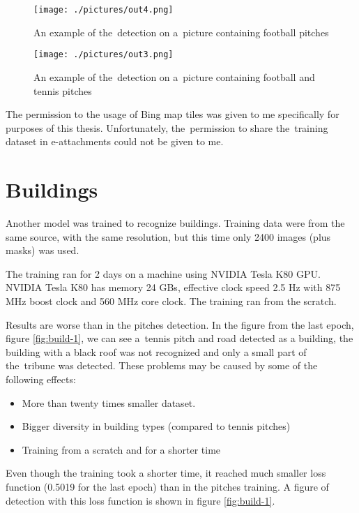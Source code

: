 \begin{figure}[H]
   \centering
	\texttt{[image: ./pictures/out4.png]}
	\caption[Detection of football pitches, another resolution]{An example of
	the~detection on a~picture containing football pitches}
      \label{fig:football2}
\end{figure}

\begin{figure}[H]
   \centering
	\texttt{[image: ./pictures/out3.png]}
	\caption[Detection of football and tennis pitches]{An example of the~detection
	on a~picture containing football and tennis pitches}
      \label{fig:football-tennis}
\end{figure}

The permission to the usage of Bing map tiles was given to me specifically for 
purposes of this thesis. Unfortunately, the~permission to share the~training 
dataset in e-attachments could not be given to me.

\section{Buildings}

Another model was trained to recognize buildings. Training data were from the
same source, with the same resolution, but this time only 2400 images (plus
masks) was used.

The training ran for 2 days on a machine using NVIDIA Tesla K80 GPU. NVIDIA
Tesla K80 has memory 24 GBs, effective clock speed 2.5 Hz with 875 MHz boost
clock and 560 MHz core clock. The training ran from the scratch.

Results are worse than in the pitches detection. In the figure from the last
epoch, figure \ref{fig:build-1},
we can see a~tennis pitch and road detected as a building, the building with
a black roof was not recognized and only a small part of the~tribune was
detected.
These problems may be caused by some of the following effects:
\begin{itemize}
	\item More than twenty times smaller dataset.
	\item Bigger diversity in building types (compared to tennis pitches)
	\item Training from a scratch and for a shorter time
\end{itemize}

Even though the training took a shorter time, it reached much smaller loss
function (0.5019 for the last epoch) than in the pitches training. A figure of
detection with this loss
function is shown in figure \ref{fig:build-1}.

